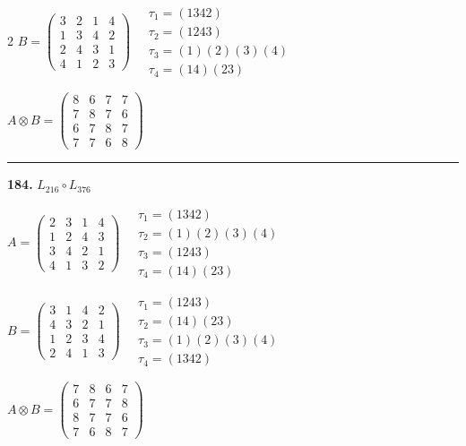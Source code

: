 \begin{multicols}{2}
$B = \begin{pmatrix} 3 & 2 & 1 & 4 \\ 1 & 3 & 4 & 2 \\ 2 & 4 & 3 & 1 \\ 4 & 1 & 2 & 3 \end{pmatrix} \quad \begin{matrix} \tau_{1}=(1 3 4 2) \\ \tau_{2}=(1 2 4 3) \\ \tau_{3}=(1)(2)(3)(4) \\ \tau_{4}=(1 4)(2 3) \end{matrix}$

$A \otimes B = \begin{pmatrix} 8 & 6 & 7 & 7 \\ 7 & 8 & 7 & 6 \\ 6 & 7 & 8 & 7 \\ 7 & 7 & 6 & 8 \end{pmatrix}$

\vspace{0.3em}
\hrule
\vspace{0.3em}

\noindent\textbf{184.} $L_{216} \circ L_{376}$

$A = \begin{pmatrix} 2 & 3 & 1 & 4 \\ 1 & 2 & 4 & 3 \\ 3 & 4 & 2 & 1 \\ 4 & 1 & 3 & 2 \end{pmatrix} \quad \begin{matrix} \tau_{1}=(1 3 4 2) \\ \tau_{2}=(1)(2)(3)(4) \\ \tau_{3}=(1 2 4 3) \\ \tau_{4}=(1 4)(2 3) \end{matrix}$

$B = \begin{pmatrix} 3 & 1 & 4 & 2 \\ 4 & 3 & 2 & 1 \\ 1 & 2 & 3 & 4 \\ 2 & 4 & 1 & 3 \end{pmatrix} \quad \begin{matrix} \tau_{1}=(1 2 4 3) \\ \tau_{2}=(1 4)(2 3) \\ \tau_{3}=(1)(2)(3)(4) \\ \tau_{4}=(1 3 4 2) \end{matrix}$

$A \otimes B = \begin{pmatrix} 7 & 8 & 6 & 7 \\ 6 & 7 & 7 & 8 \\ 8 & 7 & 7 & 6 \\ 7 & 6 & 8 & 7 \end{pmatrix}$


\end{multicols}
